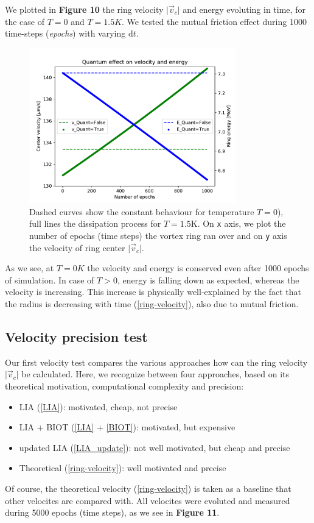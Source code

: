 We plotted in \textbf{Figure 10} the ring velocity $\vert \vec{v}_c \vert $ and energy evoluting in time, for the case of $T=0$ and $T=1.5\unit{K}$. We tested the mutual friction effect during 1000 time-steps (\textit{epochs}) with varying $\text{d}t$.

\begin{figure}[h]
	\centering
	\includegraphics[width=0.8\textwidth]{graphics/results/Tzero}
	\caption{Dashed curves show the constant behaviour for temperature $T=0$), full lines the dissipation process for $T=1.5\text{K}$. On \texttt{x} axis, we plot the number of epochs (time steps) the vortex ring ran over and on \texttt{y} axis the velocity of ring center $\vert \vec{v}_c \vert $.}
\end{figure}

As we see, at $T=0\unit{K}$ the velocity and energy is conserved even after 1000 epochs of simulation. In case of $T>0$, energy is falling down as expected, whereas the velocity is increasing. This increase is physically well-explained by the fact that the radius is decreasing with time (\ref{ring-velocity}), also due to mutual friction.

\subsection*{Velocity precision test}

Our first velocity test compares the various approaches how can the ring velocity $\vert \vec{v}_c \vert $ be calculated. Here, we recognize between four approaches, based on its theoretical motivation, computational complexity and precision:
\begin{itemize}
	\item LIA (\ref{LIA}): motivated, cheap, not precise
	\item LIA + BIOT (\ref{LIA} + \ref{BIOT}): motivated, but expensive
	\item updated LIA (\ref{LIA_update}): not well motivated, but cheap and precise
	\item Theoretical (\ref{ring-velocity}): well motivated and precise
\end{itemize}
Of course, the theoretical velocity (\ref{ring-velocity}) is taken as a baseline that other velocites are compared with. All velocites were evoluted and measured during 5000 epochs (time steps), as we see in \textbf{Figure 11}.

